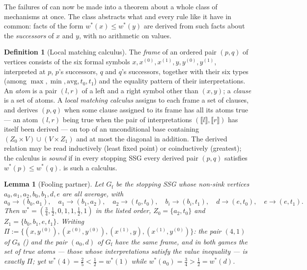 \documentclass[11pt]{article}
\theoremstyle{plain}
\newtheorem{lemma}[theorem]{Lemma}
\theoremstyle{definition}
\newtheorem{definition}[theorem]{Definition}
\begin{document}
The failures of  can now be made into a theorem about
a whole class of mechanisms at once. The class abstracts what
 and every rule like it have in common: facts of the
form $w^\ast(x)\le w^\ast(y)$ are derived from such facts about the
\emph{successors} of $x$ and $y$, with no arithmetic on values.

\begin{definition}[Local matching calculus]\label{def:lmc}
The \emph{frame} of an ordered pair $(p,q)$ of vertices consists of the
six formal symbols $x,x^{(0)},x^{(1)},y,y^{(0)},y^{(1)}$, interpreted at
$p$, $p$'s successors, $q$ and $q$'s successors, together with their six
types (among $\max,\min,\mathrm{avg},t_0,t_1$) and the equality pattern
of their interpretations. An \emph{atom} is a pair $(l,r)$ of a left and
a right symbol other than $(x,y)$; a \emph{clause} is a set of atoms. A
\emph{local matching calculus} assigns to each frame a set of clauses,
and derives $(p,q)$ when some clause assigned to its frame has all its
atoms true --- an atom $(l,r)$ being true when the pair of
interpretations $(\llbracket l\rrbracket,\llbracket r\rrbracket)$ has
itself been derived --- on top of an unconditional base containing
$(Z_0\times V)\cup(V\times Z_1)$ and at most the diagonal in addition.
The derived relation may be read inductively (least fixed point) or
coinductively (greatest); the calculus is \emph{sound} if in every
stopping SSG every derived pair $(p,q)$ satisfies
$w^\ast(p)\le w^\ast(q)$.  is such a calculus.
\end{definition}

\begin{lemma}[Fooling partner]\label{lem:fooling-partner}
Let $G_{\mathrm{f}}$ be the stopping SSG whose non-sink vertices
$a_0,a_1,a_2,b_0,b_1,d,e$ are all average, with
\[
  a_0\to(b_0,a_1),\quad a_1\to(b_1,a_2),\quad a_2\to(t_0,t_0),\quad
  b_i\to(b_i,t_1),\quad d\to(e,t_0),\quad e\to(e,t_1).
\]
Then $w^\ast=(\tfrac34,\tfrac12,0,1,1,\tfrac12,1)$ in the listed order,
$Z_0=\{a_2,t_0\}$ and $Z_1=\{b_0,b_1,e,t_1\}$. Writing
$\Pi:=\{(x,y^{(0)}),(x^{(0)},y^{(0)}),(x^{(1)},y),(x^{(1)},y^{(0)})\}$:
the pair $(4,1)$ of $G_8$ () and the pair
$(a_0,d)$ of $G_{\mathrm{f}}$ have the same frame, and in both games the set of
\emph{true} atoms --- those whose interpretations satisfy the value
inequality --- is exactly $\Pi$; yet
$w^\ast(4)=\tfrac25<\tfrac12=w^\ast(1)$ while
$w^\ast(a_0)=\tfrac34>\tfrac12=w^\ast(d)$.
\end{lemma}
\end{document}
